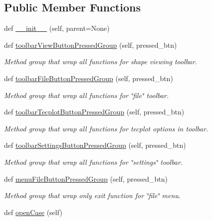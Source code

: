\subsection*{Public Member Functions}
\begin{DoxyCompactItemize}
\item 
def \hyperlink{a00078_a10b91a0caafffe00be0f4fa9c7a022dc}{\+\_\+\+\_\+init\+\_\+\+\_\+} (self, parent=None)
\item 
def \hyperlink{a00078_ade955a1fc8334b12726d9f462ed25c62}{toolbar\+View\+Button\+Pressed\+Group} (self, pressed\+\_\+btn)
\begin{DoxyCompactList}\small\item\em Method group that wrap all functions for shape viewing toolbar. \end{DoxyCompactList}\item 
def \hyperlink{a00078_ab5cf733dc40f2b17761056148fd51263}{toolbar\+File\+Button\+Pressed\+Group} (self, pressed\+\_\+btn)
\begin{DoxyCompactList}\small\item\em Method group that wrap all functions for \char`\"{}file\char`\"{} toolbar. \end{DoxyCompactList}\item 
def \hyperlink{a00078_aabfc46144de45158b8d9c8952cfa1a7d}{toolbar\+Tecplot\+Button\+Pressed\+Group} (self, pressed\+\_\+btn)
\begin{DoxyCompactList}\small\item\em Method group that wrap all functions for tecplot options in toolbar. \end{DoxyCompactList}\item 
def \hyperlink{a00078_abe6ec5c591c19b280f2e24bb198a1d6b}{toolbar\+Settings\+Button\+Pressed\+Group} (self, pressed\+\_\+btn)
\begin{DoxyCompactList}\small\item\em Method group that wrap all functions for \char`\"{}settings\char`\"{} toolbar. \end{DoxyCompactList}\item 
def \hyperlink{a00078_aedcbcf23c32b9661d48f28e11c0c7172}{menu\+File\+Button\+Pressed\+Group} (self, pressed\+\_\+btn)
\begin{DoxyCompactList}\small\item\em Method group that wrap only exit function for \char`\"{}file\char`\"{} menu. \end{DoxyCompactList}\item 
def \hyperlink{a00078_ac45b825bd62e01689fb2987a0a2d850a}{open\+Case} (self)

\end{DoxyCompactItemize}

